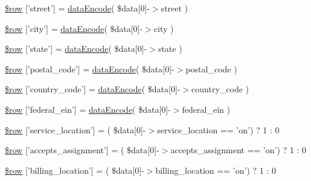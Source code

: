 \begin{DoxyCompactItemize}
\item 
\hyperlink{patientfile_2immnunization_2data__update_8ejs_8php_a7333deeacbe82dc6e01b7e9e86eb3e5a}{\$row} \mbox{[}'street'\mbox{]} = \hyperlink{data_exchange_8class_8php_a18220e6e744fcb46d788ed8b03b85f62}{data\-Encode}( \$data\mbox{[}0\mbox{]}-\/$>$street )
\item 
\hyperlink{patientfile_2immnunization_2data__update_8ejs_8php_abc2948b74989328277b5513f9ba22e4e}{\$row} \mbox{[}'city'\mbox{]} = \hyperlink{data_exchange_8class_8php_a18220e6e744fcb46d788ed8b03b85f62}{data\-Encode}( \$data\mbox{[}0\mbox{]}-\/$>$city )
\item 
\hyperlink{patientfile_2immnunization_2data__update_8ejs_8php_a652ce4ee989023692939900810b2a70a}{\$row} \mbox{[}'state'\mbox{]} = \hyperlink{data_exchange_8class_8php_a18220e6e744fcb46d788ed8b03b85f62}{data\-Encode}( \$data\mbox{[}0\mbox{]}-\/$>$state )
\item 
\hyperlink{patientfile_2immnunization_2data__update_8ejs_8php_ad7806756ac25ee8772f6b02f00d601b7}{\$row} \mbox{[}'postal\-\_\-code'\mbox{]} = \hyperlink{data_exchange_8class_8php_a18220e6e744fcb46d788ed8b03b85f62}{data\-Encode}( \$data\mbox{[}0\mbox{]}-\/$>$postal\-\_\-code )
\item 
\hyperlink{patientfile_2immnunization_2data__update_8ejs_8php_a7c5128fc922226763e03d46ff4b7a35e}{\$row} \mbox{[}'country\-\_\-code'\mbox{]} = \hyperlink{data_exchange_8class_8php_a18220e6e744fcb46d788ed8b03b85f62}{data\-Encode}( \$data\mbox{[}0\mbox{]}-\/$>$country\-\_\-code )
\item 
\hyperlink{patientfile_2immnunization_2data__update_8ejs_8php_ab89a458f1e0bf0241b5dbb11f14f56e3}{\$row} \mbox{[}'federal\-\_\-ein'\mbox{]} = \hyperlink{data_exchange_8class_8php_a18220e6e744fcb46d788ed8b03b85f62}{data\-Encode}( \$data\mbox{[}0\mbox{]}-\/$>$federal\-\_\-ein )
\item 
\hyperlink{patientfile_2immnunization_2data__update_8ejs_8php_abb2e5d696b624c8bca263c29503b7350}{\$row} \mbox{[}'service\-\_\-location'\mbox{]} = ( \$data\mbox{[}0\mbox{]}-\/$>$service\-\_\-location == 'on') ? 1 \-: 0
\item 
\hyperlink{patientfile_2immnunization_2data__update_8ejs_8php_a11d3455aa396c9c69454f3e6fad3ec6c}{\$row} \mbox{[}'accepts\-\_\-assignment'\mbox{]} = ( \$data\mbox{[}0\mbox{]}-\/$>$accepts\-\_\-assignment == 'on') ? 1 \-: 0
\item 
\hyperlink{patientfile_2immnunization_2data__update_8ejs_8php_a65028e126c36dd80a9536adb4a71e013}{\$row} \mbox{[}'billing\-\_\-location'\mbox{]} = ( \$data\mbox{[}0\mbox{]}-\/$>$billing\-\_\-location == 'on') ? 1 \-: 0

\end{DoxyCompactItemize}
